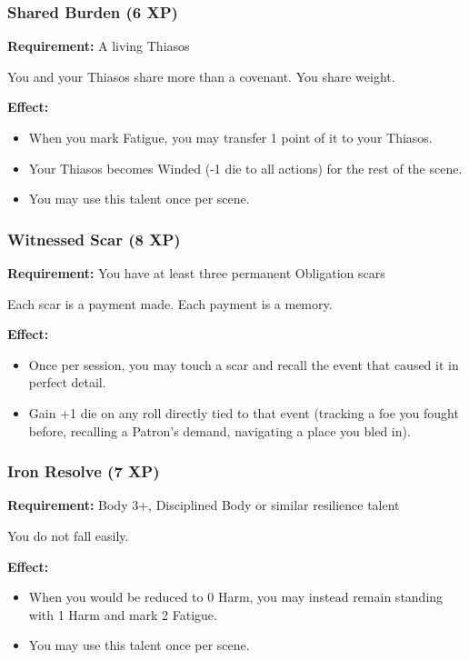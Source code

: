 \subsubsection{Shared Burden (6 XP)}

\textbf{Requirement:} A living Thiasos

You and your Thiasos share more than a covenant. You share weight.

\textbf{Effect:}
\begin{itemize}
\item When you mark Fatigue, you may transfer 1 point of it to your Thiasos.
\item Your Thiasos becomes Winded (-1 die to all actions) for the rest of the scene.
\item You may use this talent once per scene.
\end{itemize}

\subsubsection{Witnessed Scar (8 XP)}

\textbf{Requirement:} You have at least three permanent Obligation scars

Each scar is a payment made. Each payment is a memory.

\textbf{Effect:}
\begin{itemize}
\item Once per session, you may touch a scar and recall the event that caused it in perfect detail.
\item Gain +1 die on any roll directly tied to that event (tracking a foe you fought before, recalling a Patron's demand, navigating a place you bled in).
\end{itemize}

\subsubsection{Iron Resolve (7 XP)}

\textbf{Requirement:} Body 3+, Disciplined Body or similar resilience talent

You do not fall easily.

\textbf{Effect:}
\begin{itemize}
\item When you would be reduced to 0 Harm, you may instead remain standing with 1 Harm and mark 2 Fatigue.
\item You may use this talent once per scene.
\end{itemize}

